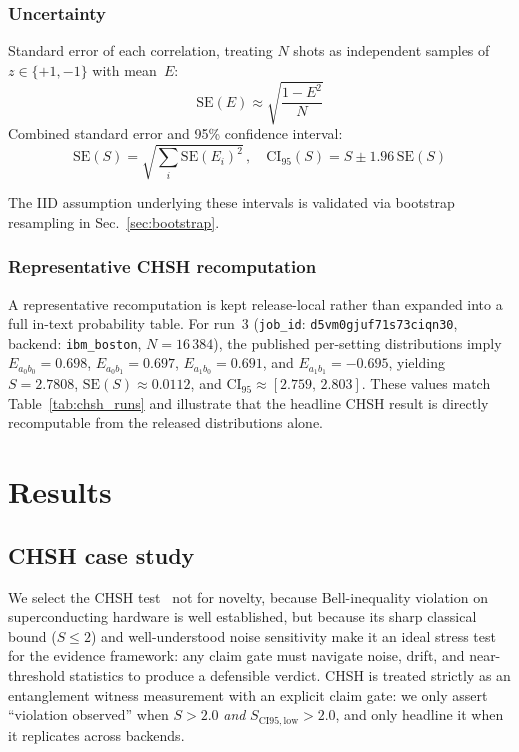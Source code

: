 \documentclass[aps,prxquantum,twocolumn,superscriptaddress,amsmath,amssymb,longbibliography,floatfix]{revtex4-2}
\begin{document}
\subsubsection{Uncertainty}

Standard error of each correlation, treating $N$ shots as independent samples of $z \in \{+1, -1\}$ with mean~$E$:
\begin{equation}
  \mathrm{SE}(E) \approx \sqrt{\frac{1 - E^2}{N}}
\end{equation}
Combined standard error and 95\% confidence interval:
\begin{equation}
  \mathrm{SE}(S) = \sqrt{\sum_i \mathrm{SE}(E_i)^2}\,, \quad
  \mathrm{CI}_{95}(S) = S \pm 1.96 \, \mathrm{SE}(S)
\end{equation}

The IID assumption underlying these intervals is validated via bootstrap resampling in Sec.~\ref{sec:bootstrap}.

\subsubsection{Representative CHSH recomputation}
\label{sec:worked}

A representative recomputation is kept release-local rather than expanded into a full in-text probability table. For run~3 (\texttt{job\_id}: \texttt{d5vm0gjuf71s73ciqn30}, backend: \texttt{ibm\_boston}, $N{=}16\,384$), the published per-setting distributions imply $E_{a_0b_0} = 0.698$, $E_{a_0b_1} = 0.697$, $E_{a_1b_0} = 0.691$, and $E_{a_1b_1} = -0.695$, yielding $S = 2.7808$, $\mathrm{SE}(S) \approx 0.0112$, and $\mathrm{CI}_{95} \approx [2.759,\, 2.803]$. These values match Table~\ref{tab:chsh_runs} and illustrate that the headline CHSH result is directly recomputable from the released distributions alone.

\section{Results}
\label{sec:results}

\subsection{CHSH case study}
\label{sec:chsh}

We select the CHSH test~\cite{Clauser1969,Aspect1982} not for novelty, because Bell-inequality violation on superconducting hardware is well established, but because its sharp classical bound ($S \leq 2$) and well-understood noise sensitivity make it an ideal stress test for the evidence framework: any claim gate must navigate noise, drift, and near-threshold statistics to produce a defensible verdict. CHSH is treated strictly as an entanglement witness measurement with an explicit claim gate: we only assert ``violation observed'' when $S > 2.0$ \emph{and} $S_{\mathrm{CI95,low}} > 2.0$, and only headline it when it replicates across backends.
\end{document}

